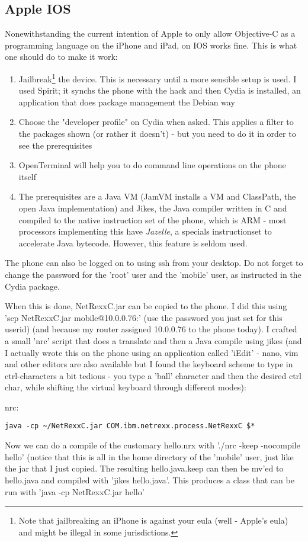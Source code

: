 \subsection{Apple IOS}
Nonewithstanding the current intention of Apple to only allow Objective-C
as a programming language on the iPhone and iPad, \nr{} on IOS works fine. This is what one should do to make it work:
\begin{enumerate}
\item Jailbreak\footnote{Note that jailbreaking an iPhone is against your eula (well - Apple's eula) and might be illegal in some jurisdictions.} the device. This is necessary until a more sensible setup is used. I used Spirit; it synchs the phone with the hack and then Cydia is installed, an application that does package management the Debian way
\item Choose the "developer profile" on Cydia when asked. This applies a filter to the packages shown (or rather it doesn't) - but you need to do it in order to see the prerequisites
\item OpenTerminal will help you to do command line operations on the phone itself
\item The prerequisites are a Java VM (JamVM installs a VM and
  ClassPath, the open Java implementation) and Jikes, the Java
  compiler written in C and compiled to the native instruction set of
  the phone, which is ARM - most processors implementing this have
  \emph{Jazelle}, a specials instructionset to accelerate Java
  bytecode. However, this feature is seldom used. 
\end{enumerate}
The phone can also be logged on to using ssh from your desktop. Do not forget to change the password for the 'root' user and the 'mobile' user, as instructed in the Cydia package.

When this is done, NetRexxC.jar can be copied to the phone. I did this using 'scp NetRexxC.jar mobile@10.0.0.76:' (use the password you just set for this userid) (and because my router assigned 10.0.0.76 to the phone today). I crafted a small 'nrc' script that does a translate and then a Java compile using jikes (and I actually wrote this on the phone using an application called 'iEdit' - nano, vim and other editors are also available but I found the keyboard scheme to type in ctrl-characters a bit tedious - you type a 'ball' character and then the desired ctrl char, while shifting the virtual keyboard through different modes):

nrc:
\begin{verbatim}
java -cp ~/NetRexxC.jar COM.ibm.netrexx.process.NetRexxC $*
\end{verbatim}
Now we can do a compile of the customary hello.nrx with './nrc -keep -nocompile hello' (notice that this is all in the home directory of the 'mobile' user, just like the jar that I just copied. The resulting hello.java.keep can then be mv'ed to hello.java and compiled with 'jikes hello.java'. This produces a class that can be run with 'java -cp NetRexxC.jar hello'
